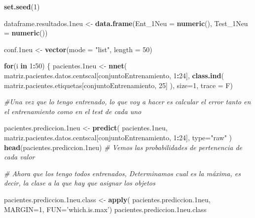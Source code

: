 \documentclass[]{article}
\newenvironment{Shaded}{\begin{snugshade}}{\end{snugshade}}
\newcommand{\CommentTok}[1]{\textcolor[rgb]{0.56,0.35,0.01}{\textit{#1}}}
\newcommand{\ControlFlowTok}[1]{\textcolor[rgb]{0.13,0.29,0.53}{\textbf{#1}}}
\newcommand{\DataTypeTok}[1]{\textcolor[rgb]{0.13,0.29,0.53}{#1}}
\newcommand{\DecValTok}[1]{\textcolor[rgb]{0.00,0.00,0.81}{#1}}
\newcommand{\FloatTok}[1]{\textcolor[rgb]{0.00,0.00,0.81}{#1}}
\newcommand{\KeywordTok}[1]{\textcolor[rgb]{0.13,0.29,0.53}{\textbf{#1}}}
\newcommand{\NormalTok}[1]{#1}
\newcommand{\OperatorTok}[1]{\textcolor[rgb]{0.81,0.36,0.00}{\textbf{#1}}}
\newcommand{\StringTok}[1]{\textcolor[rgb]{0.31,0.60,0.02}{#1}}
\begin{document}
\begin{Shaded}
\begin{Highlighting}[]
\KeywordTok{set.seed}\NormalTok{(}\DecValTok{1}\NormalTok{)}

\NormalTok{dataframe.resultados}\FloatTok{.1}\NormalTok{neu <-}\StringTok{ }\KeywordTok{data.frame}\NormalTok{(}\DataTypeTok{Ent_1Neu =} \KeywordTok{numeric}\NormalTok{(),}
                                        \DataTypeTok{Test_1Neu =} \KeywordTok{numeric}\NormalTok{())}

\NormalTok{conf}\FloatTok{.1}\NormalTok{neu <-}\StringTok{ }\KeywordTok{vector}\NormalTok{(}\DataTypeTok{mode =} \StringTok{"list"}\NormalTok{, }\DataTypeTok{length =} \DecValTok{50}\NormalTok{)}

\ControlFlowTok{for}\NormalTok{(i }\ControlFlowTok{in} \DecValTok{1}\OperatorTok{:}\DecValTok{50}\NormalTok{)}
\NormalTok{\{}
\NormalTok{  pacientes}\FloatTok{.1}\NormalTok{neu <-}\StringTok{ }\KeywordTok{nnet}\NormalTok{( matriz.pacientes.datos.centscal[conjuntoEntrenamiento, }\DecValTok{1}\OperatorTok{:}\DecValTok{24}\NormalTok{], }
                          \KeywordTok{class.ind}\NormalTok{( matriz.pacientes.etiquetas[conjuntoEntrenamiento, }\DecValTok{25}\NormalTok{] ), }
                          \DataTypeTok{size=}\DecValTok{1}\NormalTok{, }
                          \DataTypeTok{trace =}\NormalTok{ F)}

  \CommentTok{#Una vez que lo tengo entrenado, lo que voy a hacer es calcular el error tanto en el entrenamiento como en el test de cada uno}
  
\NormalTok{  pacientes.prediccion}\FloatTok{.1}\NormalTok{neu <-}\StringTok{ }\KeywordTok{predict}\NormalTok{( pacientes}\FloatTok{.1}\NormalTok{neu, }
\NormalTok{                                        matriz.pacientes.datos.centscal[conjuntoEntrenamiento, }\DecValTok{1}\OperatorTok{:}\DecValTok{24}\NormalTok{], }
                                        \DataTypeTok{type=}\StringTok{"raw"}\NormalTok{ )}
  \KeywordTok{head}\NormalTok{(pacientes.prediccion}\FloatTok{.1}\NormalTok{neu) }\CommentTok{# Vemos las probabilidades de pertenencia de cada valor}
  
  \CommentTok{# Ahora que los tengo todos entrenados, Determinamos cual es la máxima, es decir, la clase a la que hay que asignar los objetos}
  
\NormalTok{  pacientes.prediccion}\FloatTok{.1}\NormalTok{neu.class <-}\StringTok{ }\KeywordTok{apply}\NormalTok{( pacientes.prediccion}\FloatTok{.1}\NormalTok{neu, }\DataTypeTok{MARGIN=}\DecValTok{1}\NormalTok{, }\DataTypeTok{FUN=}\StringTok{'which.is.max'}\NormalTok{)}
\NormalTok{  pacientes.prediccion}\FloatTok{.1}\NormalTok{neu.class}
  

\end{Highlighting}
\end{Shaded}
\end{document}

